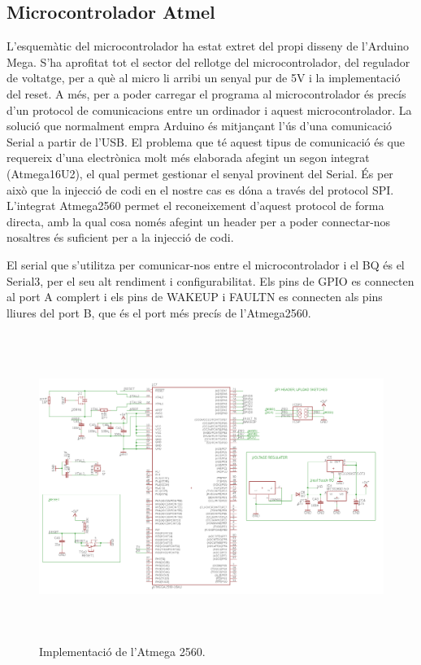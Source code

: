\newpage 

\subsection{Microcontrolador Atmel}
L'esquemàtic del microcontrolador ha estat extret del propi disseny de l'Arduino Mega. S'ha aprofitat tot el sector del rellotge del microcontrolador, del regulador de voltatge, per a què al micro li arribi un senyal pur de 5V i la implementació del reset. A més, per a poder carregar el programa al microcontrolador és precís d'un protocol de comunicacions entre un ordinador i aquest microcontrolador. La solució que normalment empra Arduino és mitjançant l'ús d'una comunicació Serial a partir de l'USB. El problema que té aquest tipus de comunicació és que requereix d'una electrònica molt més elaborada afegint un segon integrat (Atmega16U2), el qual permet gestionar el senyal provinent del Serial. És per això que la injecció de codi en el nostre cas es dóna a través del protocol SPI. L'integrat Atmega2560 permet el reconeixement d'aquest protocol de forma directa, amb la qual cosa només afegint un header per a poder connectar-nos nosaltres és suficient per a la injecció de codi.

El serial que s'utilitza per comunicar-nos entre el microcontrolador i el BQ és el Serial3, per el seu alt rendiment i configurabilitat. Els pins de GPIO es connecten al port A complert i els pins de WAKEUP i FAULTN es connecten als pins lliures del port B, que és el port més precís de l'Atmega2560.
\begin{figure}[H]
	\centering
    \includegraphics[width=\textwidth, height=10cm] {Prototip/schatmega2560.png}
    \caption{Implementació de l'Atmega 2560.}
\end{figure}